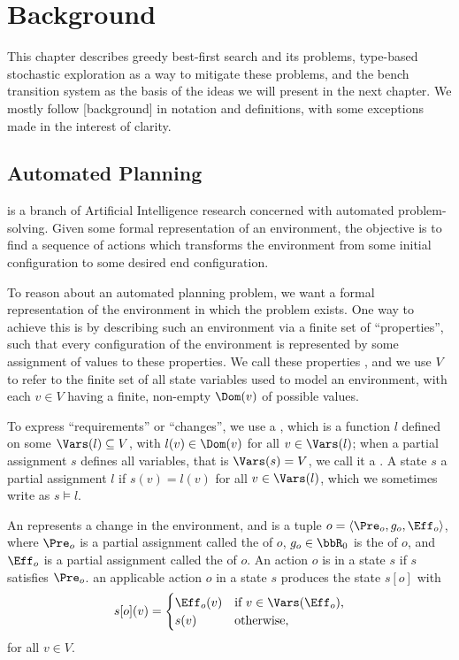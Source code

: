 \chapter{Background}

This chapter describes greedy best-first search and its problems, type-based stochastic exploration as a way to mitigate these problems, and the bench transition system as the basis of the ideas we will present in the next chapter. We mostly follow [background] in notation and definitions, with some exceptions made in the interest of clarity.

\section{Automated Planning}

 is a branch of Artificial Intelligence research concerned with automated problem-solving. Given some formal representation of an environment, the objective is to find a sequence of actions which transforms the environment from some initial configuration to some desired end configuration.


To reason about an automated planning problem, we want a formal representation of the environment in which the problem exists. One way to achieve this is by describing such an environment via a finite set of ``properties'', such that every configuration of the environment is represented by some assignment of values to these properties. We call these properties , and we use $V$ to refer to the finite set of all state variables used to model an environment, with each $v\in V$ having a finite, non-empty  $\Dom(v)$ of possible values.

To express ``requirements'' or ``changes'', we use a , which is a function $l$ defined on some  $\Vars(l)\subseteq V$, with $l(v)\in\Dom(v)$ for all $v\in\Vars(l)$; when a partial assignment $s$ defines all variables, that is $\Vars(s)=V$, we call it a . A state $s$  a partial assignment $l$ if $s(v)=l(v)$ for all $v\in\Vars(l)$, which we sometimes write as $s\models l$.

An  represents a change in the environment, and is a tuple $o=\langle\Pre_o,g_o,\Eff_o\rangle$, where $\Pre_o$ is a partial assignment called the  of $o$, $g_o\in\bbR_0$ is the  of $o$, and $\Eff_o$ is a partial assignment called the  of $o$. An action $o$ is  in a state $s$ if $s$ satisfies $\Pre_o$.  an applicable action $o$ in a state $s$ produces the state $s[o]$ with $$s[o](v)=\begin{cases}\Eff_o(v)&\text{if $v\in\Vars(\Eff_o)$,}\\s(v)&\text{otherwise,}\end{cases}$$ for all $v\in V$.

